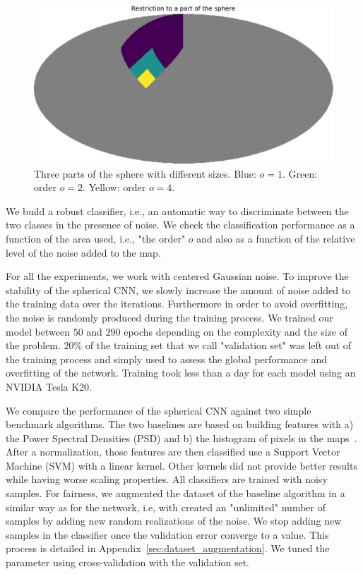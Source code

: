 \documentclass[final,twocolumn,3p,times,authoryear]{elsarticle}
\newcommand{\todo}[1]{{\color[rgb]{.6,.1,.6}{#1}}}
\newcommand{\1}{\b{1}}              %
\newcommand{\0}{\b{0}}              %
\begin{document}
\begin{figure}[!ht]
\centering
\includegraphics[width=\linewidth]{part_sphere}
\caption{Three parts of the sphere with different sizes. Blue: $o=1$. Green: order $o=2$. Yellow: order $o=4$.}
\label{fig:part_sphere}
\end{figure}

We build a robust classifier, i.e., an automatic way to
discriminate between the two classes in the presence of noise.
We check the classification performance as a function of the area used, i.e., "the order" $o$ and also as a function of the relative level of the noise added to the map.

For all the
experiments, we work with centered Gaussian noise. \todo{Tomek: could you put a
justification.} To improve the
stability of the spherical CNN, we slowly increase the amount of noise added to
the training data over the iterations. Furthermore in order to avoid
overfitting, the noise is randomly produced during the training process. We trained our
model between $50$ and $290$ epochs depending on the complexity and the size of
the problem. $20\%$ of the training set that we call "validation set" was left out of the training process and simply used to assess the global performance and overfitting of
the network.
Training took less than a day for each model using an NVIDIA Tesla K20.

We compare the performance of the spherical CNN against two simple benchmark
algorithms. The two baselines are based on building features with a) the Power
Spectral Densities (PSD) and b) the histogram of pixels in the maps~\cite{patton2017cosmologicalconstraints}.
After a normalization, those features are then classified use a Support Vector
Machine (SVM) with a linear kernel. Other kernels did not provide better results
while having worse scaling properties. All classifiers are trained with noisy samples. For fairness, we augmented the dataset
of the baseline algorithm in a similar way as for the network, i.e, with
created an "unlimited" number of samples by adding new random realizations of
the noise. We stop adding new samples in the classifier once the validation
error converge to a value. This process is detailed in Appendix~\ref{sec:dataset_augmentation}. We tuned the parameter using cross-validation with the validation set.
\end{document}
